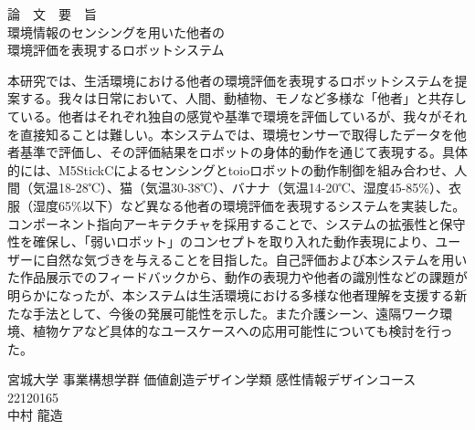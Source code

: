 \begin{center}
  {\Large
    論　文　要　旨\\
    \vspace{2\zh}
    環境情報のセンシングを用いた他者の\\環境評価を表現するロボットシステム\\
    \vspace{2\zh}
  }
\end{center}

本研究では、生活環境における他者の環境評価を表現するロボットシステムを提案する。我々は日常において、人間、動植物、モノなど多様な「他者」と共存している。他者はそれぞれ独自の感覚や基準で環境を評価しているが、我々がそれを直接知ることは難しい。本システムでは、環境センサーで取得したデータを他者基準で評価し、その評価結果をロボットの身体的動作を通じて表現する。具体的には、M5StickCによるセンシングとtoioロボットの動作制御を組み合わせ、人間（気温18-28℃）、猫（気温30-38℃）、バナナ（気温14-20℃、湿度45-85\%）、衣服（湿度65\%以下）など異なる他者の環境評価を表現するシステムを実装した。コンポーネント指向アーキテクチャを採用することで、システムの拡張性と保守性を確保し、「弱いロボット」のコンセプトを取り入れた動作表現により、ユーザーに自然な気づきを与えることを目指した。自己評価および本システムを用いた作品展示でのフィードバックから、動作の表現力や他者の識別性などの課題が明らかになったが、本システムは生活環境における多様な他者理解を支援する新たな手法として、今後の発展可能性を示した。また介護シーン、遠隔ワーク環境、植物ケアなど具体的なユースケースへの応用可能性についても検討を行った。

\vspace{3\zh}

\begin{flushright}
  宮城大学 事業構想学群 価値創造デザイン学類 感性情報デザインコース\\
  22120165\\ %
  中村 龍造\\ %
\end{flushright}
